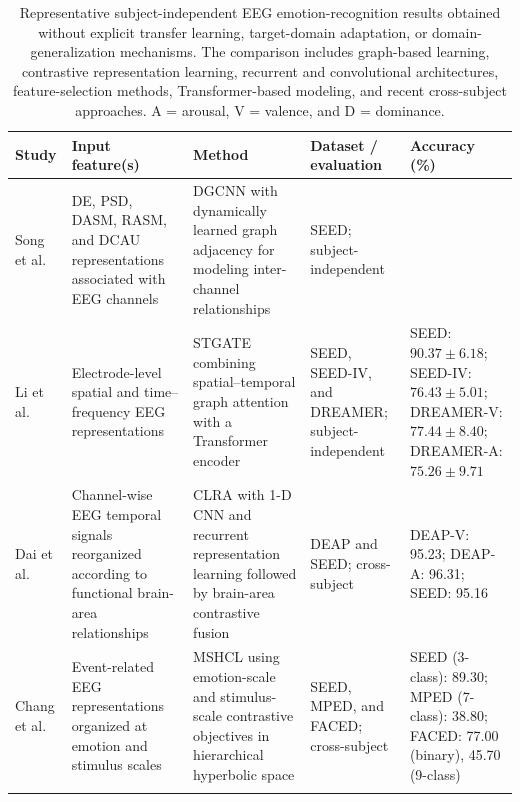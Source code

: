 \documentclass{WileyMSP-template}
\newcommand{\lightrowsep}{%
    \arrayrulecolor{lightrowgray}%
    \specialrule{0.30pt}{3.5pt}{3.5pt}%
    \arrayrulecolor{black}%
}
\begin{document}
\begin{table}
\centering

\caption{Representative subject-independent EEG emotion-recognition results
obtained without explicit transfer learning, target-domain adaptation, or
domain-generalization mechanisms. The comparison includes graph-based learning,
contrastive representation learning, recurrent and convolutional architectures,
feature-selection methods, Transformer-based modeling, and recent cross-subject
approaches. A = arousal, V = valence, and D = dominance.}

\label{tab:subject_independent_results}

\scriptsize
\setlength{\tabcolsep}{2.5pt}
\renewcommand{\arraystretch}{1.12}

\begin{tabularx}{\textheight}{
>{\raggedright\arraybackslash}p{3.15cm}
>{\raggedright\arraybackslash}X
>{\raggedright\arraybackslash}X
>{\raggedright\arraybackslash}p{3.45cm}
>{\raggedright\arraybackslash}p{5.0cm}}

\toprule

\textbf{Study} &
\textbf{Input feature(s)} &
\textbf{Method} &
\textbf{Dataset / evaluation} &
\textbf{Accuracy (\%)} \\

\midrule

Song et al. \cite{song2020dgcnn} &
DE, PSD, DASM, RASM, and DCAU representations associated with EEG channels &
DGCNN with dynamically learned graph adjacency for modeling inter-channel relationships &
SEED; subject-independent &
79.95 \\
\lightrowsep

Li et al. \cite{li2023stgate} &
Electrode-level spatial and time--frequency EEG representations &
STGATE combining spatial--temporal graph attention with a Transformer encoder &
SEED, SEED-IV, and DREAMER; subject-independent &
SEED: $90.37 \pm 6.18$;
SEED-IV: $76.43 \pm 5.01$;
DREAMER-V: $77.44 \pm 8.40$;
DREAMER-A: $75.26 \pm 9.71$ \\
\lightrowsep

Dai et al. \cite{dai2025clra} &
Channel-wise EEG temporal signals reorganized according to functional brain-area relationships &
CLRA with 1-D CNN and recurrent representation learning followed by brain-area contrastive fusion &
DEAP and SEED; cross-subject &
DEAP-V: 95.23;
DEAP-A: 96.31;
SEED: 95.16 \\
\lightrowsep

Chang et al. \cite{chang2025mshcl} &
Event-related EEG representations organized at emotion and stimulus scales &
MSHCL using emotion-scale and stimulus-scale contrastive objectives in hierarchical hyperbolic space &
SEED, MPED, and FACED; cross-subject &
SEED (3-class): 89.30;
MPED (7-class): 38.80;
FACED: 77.00 (binary), 45.70 (9-class) \\
\lightrowsep


\end{tabularx}
\end{table}
\end{document}

